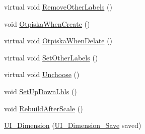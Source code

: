 \begin{DoxyCompactItemize}
virtual void \mbox{\hyperlink{class_dimension___chain_1_1_u_i___dimension_a17854a85eba47798b7459b633f1db4bb}{Remove\+Other\+Labels}} ()
\item 
void \mbox{\hyperlink{class_dimension___chain_1_1_u_i___dimension_a1973f56d9bd88725bf942bedd6d8d98d}{Otpiska\+When\+Create}} ()
\item 
virtual void \mbox{\hyperlink{class_dimension___chain_1_1_u_i___dimension_aad38da2794443edfca137c15e417bfd3}{Otpiska\+When\+Delate}} ()
\item 
virtual void \mbox{\hyperlink{class_dimension___chain_1_1_u_i___dimension_a78774f971a6494a57310623f4bf0aa4f}{Set\+Other\+Labels}} ()
\item 
virtual void \mbox{\hyperlink{class_dimension___chain_1_1_u_i___dimension_a93110c560bdd2e03e4a943be85a0f913}{Unchoose}} ()
\item 
void \mbox{\hyperlink{class_dimension___chain_1_1_u_i___dimension_a91003f2c8039c015960f15fddc418d40}{Set\+Up\+Down\+Lbls}} ()
\item 
void \mbox{\hyperlink{class_dimension___chain_1_1_u_i___dimension_a708fa8978d862ed4be1507422b99c772}{Rebuild\+After\+Scale}} ()
\item 
\mbox{\hyperlink{class_dimension___chain_1_1_u_i___dimension_a75cba81921c322680810bd593d515958}{U\+I\+\_\+\+Dimension}} (\mbox{\hyperlink{class_dimension___chain_1_1_u_i___dimension___save}{U\+I\+\_\+\+Dimension\+\_\+\+Save}} saved)
\end{DoxyCompactItemize}
